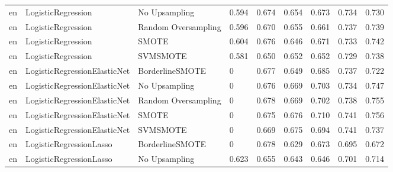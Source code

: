 \begin{tabular}{lllllllll}
      en &           LogisticRegression &       No Upsampling & 0.594 &                     0.674 &                 0.654 &                  0.673 &                                   0.734 &     0.730 \\
      en &           LogisticRegression & Random Oversampling & 0.596 &                     0.670 &                 0.655 &                  0.661 &                                   0.737 &     0.739 \\
      en &           LogisticRegression &               SMOTE & 0.604 &                     0.676 &                 0.646 &                  0.671 &                                   0.733 &     0.742 \\
      en &           LogisticRegression &            SVMSMOTE & 0.581 &                     0.650 &                 0.652 &                  0.652 &                                   0.729 &     0.738 \\
      en & LogisticRegressionElasticNet &     BorderlineSMOTE &     0 &                     0.677 &                 0.649 &                  0.685 &                                   0.737 &     0.722 \\
      en & LogisticRegressionElasticNet &       No Upsampling &     0 &                     0.676 &                 0.669 &                  0.703 &                                   0.734 &     0.747 \\
      en & LogisticRegressionElasticNet & Random Oversampling &     0 &                     0.678 &                 0.669 &                  0.702 &                                   0.738 &     0.755 \\
      en & LogisticRegressionElasticNet &               SMOTE &     0 &                     0.675 &                 0.676 &                  0.710 &                                   0.741 &     0.756 \\
      en & LogisticRegressionElasticNet &            SVMSMOTE &     0 &                     0.669 &                 0.675 &                  0.694 &                                   0.741 &     0.737 \\
      en &      LogisticRegressionLasso &     BorderlineSMOTE &     0 &                     0.678 &                 0.629 &                  0.673 &                                   0.695 &     0.672 \\
      en &      LogisticRegressionLasso &       No Upsampling & 0.623 &                     0.655 &                 0.643 &                  0.646 &                                   0.701 &     0.714 \\

\end{tabular}
